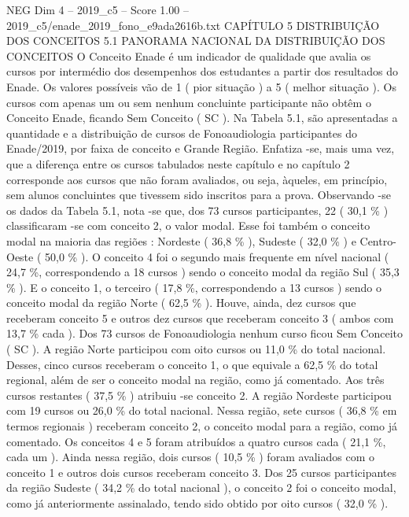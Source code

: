 \begin{textsample}{NEG Dim 4 – 2019\_c5 – Score 1.00 – 2019\_c5/enade\_2019\_fono\_e9ada2616b.txt}  \label{ex:f4_neg_164}
CAPÍTULO 5 DISTRIBUIÇÃO DOS CONCEITOS 5.1 PANORAMA NACIONAL DA DISTRIBUIÇÃO DOS CONCEITOS O Conceito Enade é um indicador de qualidade que avalia os cursos por intermédio dos desempenhos dos estudantes a partir dos resultados do Enade.
Os valores possíveis vão de 1 ( pior situação ) a 5 ( melhor situação ).
Os cursos com apenas um ou sem nenhum concluinte participante não obtêm o Conceito Enade, ficando Sem Conceito ( SC ).
Na Tabela 5.1, são apresentadas a quantidade e a distribuição de cursos de Fonoaudiologia participantes do Enade/2019, por faixa de conceito e Grande Região.
Enfatiza -se, mais uma vez, que a diferença entre os cursos tabulados neste capítulo e no capítulo 2 corresponde aos cursos que não foram avaliados, ou seja, àqueles, em princípio, sem alunos concluintes que tivessem sido inscritos para a prova.
Observando -se os dados da Tabela 5.1, nota -se que, dos 73 cursos participantes, 22 ( 30,1 \% ) classificaram -se com conceito 2, o valor modal.
Esse foi também o conceito modal na maioria das regiões : Nordeste ( 36,8 \% ), Sudeste ( 32,0 \% ) e Centro-Oeste ( 50,0 \% ).
O conceito 4 foi o segundo mais frequente em nível nacional ( 24,7 \%, correspondendo a 18 cursos ) sendo o conceito modal da região Sul ( 35,3 \% ).
E o conceito 1, o terceiro ( 17,8 \%, correspondendo a 13 cursos ) sendo o conceito modal da região Norte ( 62,5 \% ).
Houve, ainda, dez cursos que receberam conceito 5 e outros dez cursos que receberam conceito 3 ( ambos com 13,7 \% cada ).
Dos 73 cursos de Fonoaudiologia nenhum curso ficou Sem Conceito ( SC ).
A região Norte participou com oito cursos ou 11,0 \% do total nacional.
Desses, cinco cursos receberam o conceito 1, o que equivale a 62,5 \% do total regional, além de ser o conceito modal na região, como já comentado.
Aos três cursos restantes ( 37,5 \% ) atribuiu -se conceito 2.
A região Nordeste participou com 19 cursos ou 26,0 \% do total nacional.
Nessa região, sete cursos ( 36,8 \% em termos regionais ) receberam conceito 2, o conceito modal para a região, como já comentado.
Os conceitos 4 e 5 foram atribuídos a quatro cursos cada ( 21,1 \%, cada um ).
Ainda nessa região, dois cursos ( 10,5 \% ) foram avaliados com o conceito 1 e outros dois cursos receberam conceito 3.
Dos 25 cursos participantes da região Sudeste ( 34,2 \% do total nacional ), o conceito 2 foi o conceito modal, como já anteriormente assinalado, tendo sido obtido por oito cursos ( 32,0 \% ).

\end{textsample}
